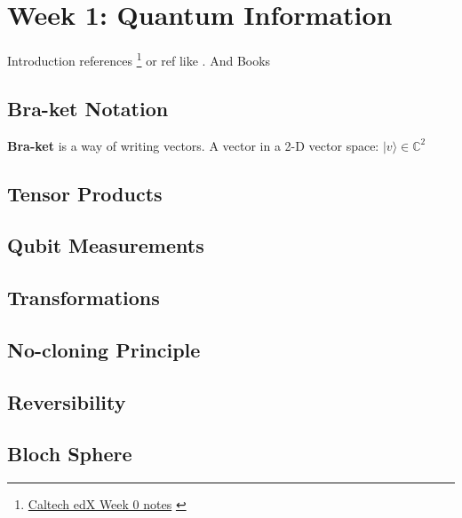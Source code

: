 \section{Week 1: Quantum Information}

Introduction references \footnote{\href{http://users.cms.caltech.edu/~vidick/teaching/120_qcrypto/LN_Week0.pdf}{Caltech edX Week 0 notes}
\label{caltech:edX:week0}} or ref like .  And Books  


\subsection{Bra-ket Notation}

\textbf{Bra-ket} is a way of writing vectors.  A vector in a 2-D vector space: $|v \rangle \in \mathbb{C}^2$

\subsection{Tensor Products}


\subsection{Qubit Measurements}


\subsection{Transformations}


\subsection{No-cloning Principle}


\subsection{Reversibility}


\subsection{Bloch Sphere}

